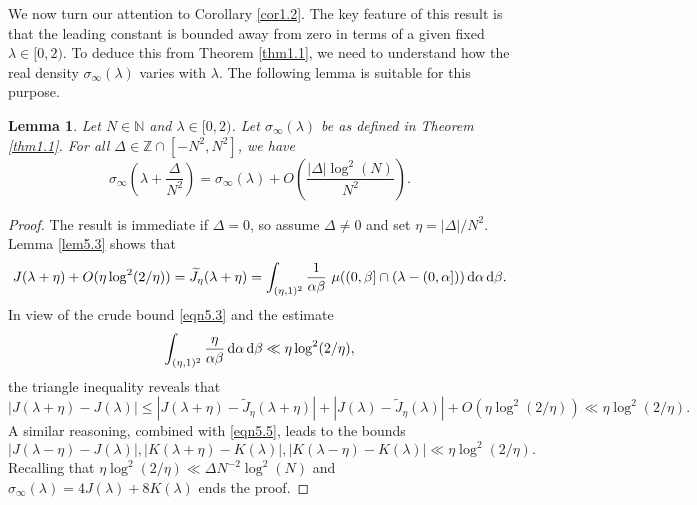 \documentclass[12pt,reqno]{amsart}
\newtheorem{lemma}[theorem]{Lemma}
\theoremstyle{definition}
\theoremstyle{remark}
\numberwithin{equation}{section}
\def \N {\mathbb{N}}
\def \Z {\mathbb{Z}}
\def\d{{\,{\rm d}}}
\newcommand\1{\mathds{1}}
\begin{document}
We now turn our attention to Corollary \ref{cor1.2}. The key feature of this result is that the leading constant is bounded away from zero in terms of a given fixed $\lambda\in[0,2)$. To deduce this from Theorem \ref{thm1.1}, we need to understand how the real density $\sigma_\infty(\lambda)$ varies with $\lambda$. The following lemma is suitable for this purpose.

\begin{lemma}\label{lem7.1}
    Let $N\in\N$ and $\lambda\in[0,2)$. Let $\sigma_\infty(\lambda)$ be as defined in Theorem \ref{thm1.1}. For all $\Delta\in\Z\cap[-N^2,N^2]$, we have
    \begin{equation*}
        \sigma_\infty\left(\lambda+\frac{\Delta}{N^2}\right) = \sigma_\infty(\lambda) + O\left( \frac{|\Delta| \log^2(N)}{N^2}\right).
    \end{equation*}
\end{lemma}
 \begin{proof}
     The result is immediate if $\Delta=0$, so assume $\Delta\neq 0$ and set $\eta = |\Delta|/N^2$. Lemma \ref{lem5.3} shows that
     \begin{equation*}
         J(\lambda+\eta)  + O(\eta\log^2(2/\eta)) = \widetilde J_\eta(\lambda+\eta) = \int_{(\eta,1)^2} \frac{1}{\alpha \beta} \ \mu( (0, \beta] \cap (\lambda - (0, \alpha]  ) )\d \alpha \d \beta.
     \end{equation*}
     In view of the crude bound \eqref{eqn5.3} and the estimate
     \begin{equation*}
         \int_{(\eta,1)^2}\frac{\eta}{\alpha\beta}\d\alpha\d\beta \ll \eta\log^2(2/\eta),
     \end{equation*}
     the triangle inequality reveals that
     \begin{equation*}
         |J(\lambda+\eta) - J(\lambda)| \leqslant |J(\lambda+\eta) - \widetilde J_\eta(\lambda+\eta)| + |J(\lambda) - \widetilde J_\eta(\lambda)| +O(\eta\log^2(2/\eta)) \ll \eta\log^2(2/\eta).
     \end{equation*}
     A similar reasoning, combined with \eqref{eqn5.5}, leads to the bounds
     \begin{equation*}
         |J(\lambda-\eta) - J(\lambda)|,|K(\lambda+ \eta) - K(\lambda)|,|K(\lambda- \eta) - K(\lambda)|\ll \eta\log^2(2/\eta).
     \end{equation*}
     Recalling that $\eta\log^2(2/\eta) \ll \Delta N^{-2}\log^2(N)$ and $\sigma_\infty(\lambda) = 4J(\lambda) + 8K(\lambda)$ ends the proof.
 \end{proof}
\end{document}
